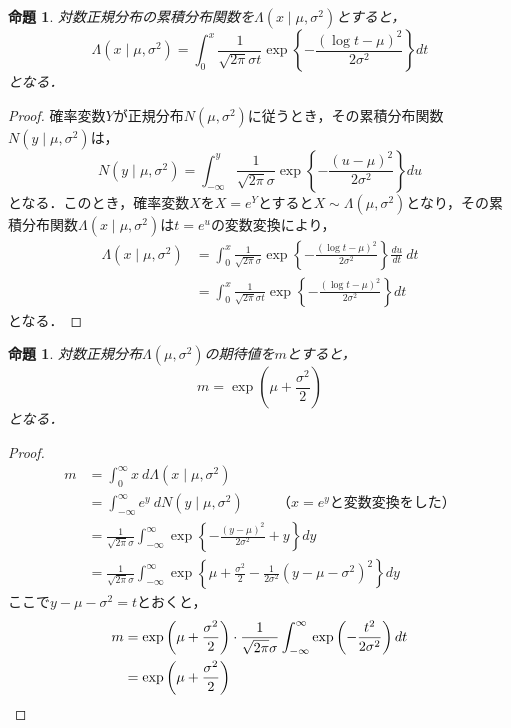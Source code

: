 \documentclass{jsarticle}
\newtheorem{prop}[dfn]{命題}
\begin{document}
\begin{prop}
対数正規分布の累積分布関数を$\Lambda(x\mid \mu, \sigma^2)$とすると，
\[ \Lambda(x\mid \mu, \sigma^2)=\int_0^x \frac{1}{\sqrt{2\pi}\sigma t}\exp \left\{ -\frac{(\log t-\mu)^2}{2\sigma^2}\right\} dt \]
となる．
\end{prop}

\begin{proof}
確率変数$Y$が正規分布$N(\mu, \sigma^2)$に従うとき，その累積分布関数$N(y\mid \mu, \sigma^2)$は，
\[ N(y\mid \mu, \sigma^2)=\int_{-\infty}^y \frac{1}{\sqrt{2\pi}\sigma}\exp \left\{ -\frac{(u-\mu)^2}{2\sigma^2}\right\} du \]
となる．このとき，確率変数$X$を$X=e^Y$とすると$X\sim \Lambda(\mu, \sigma^2)$となり，その累積分布関数$\Lambda(x\mid \mu, \sigma^2)$は$t=e^u$の変数変換により，
\begin{align*}
\Lambda(x\mid \mu, \sigma^2) &=\int_0^x \frac{1}{\sqrt{2\pi}\sigma}\exp \left\{ -\frac{(\log t-\mu)^2}{2\sigma^2}\right\} \frac{du}{dt}\ dt \\
&=\int_0^x \frac{1}{\sqrt{2\pi}\sigma t}\exp \left\{ -\frac{(\log t-\mu)^2}{2\sigma^2}\right\} dt
\end{align*}
となる．
\end{proof}

\newpage

\begin{prop}
対数正規分布$\Lambda(\mu, \sigma^2)$の期待値を$m$とすると，
\[ m=\exp \left( \mu+\frac{\sigma^2}{2}\right) \]
となる．
\end{prop}

\begin{proof}
\begin{align*}
m &=\int_0^{\infty}x\ d\Lambda(x\mid \mu, \sigma^2) \\
&=\int_{-\infty}^{\infty}e^y\ dN(y\mid \mu, \sigma^2) \hspace{1cm} \text{（$x=e^y$と変数変換をした）} \\
&=\frac{1}{\sqrt{2\pi}\sigma}\int_{-\infty}^{\infty}\exp \left\{ -\frac{(y-\mu)^2}{2\sigma^2}+y\right\} dy \\
&=\frac{1}{\sqrt{2\pi}\sigma}\int_{-\infty}^{\infty}\exp \left\{ \mu+\frac{\sigma^2}{2}-\frac{1}{2\sigma^2}(y-\mu-\sigma^2)^2 \right\} dy
\end{align*}
ここで$y-\mu-\sigma^2=t$とおくと，
\begin{align}
m &=\exp \left( \mu+\frac{\sigma^2}{2}\right) \cdot \frac{1}{\sqrt{2\pi}\sigma}\int_{-\infty}^{\infty}\exp \left( -\frac{t^2}{2\sigma^2}\right) dt \notag \\
&=\exp \left( \mu+\frac{\sigma^2}{2}\right) \notag
\end{align}
\end{proof}
\end{document}
